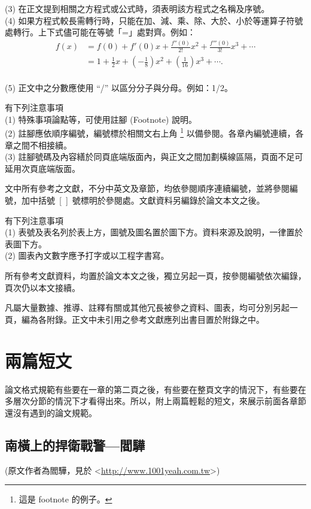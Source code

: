 \begin{description}
(3) 在正文提到相關之方程式或公式時，須表明該方程式之名稱及序號。\\
(4) 如果方程式較長需轉行時，只能在加、減、乘、除、大於、小於等運算子符號處轉行。上下式儘可能在等號「=」處對齊。例如：
\begin{equation}
\begin{split}
f(x) &= f(0) + f'(0)x + \frac{f''(0)}{2!}x^2 + \frac{f'''(0)}{3!}x^3 +\cdots \\
    &=1+\frac{1}{2}x+\left(-\frac{1}{8}\right)x^{2}+\left(\frac{1}{16}\right)x^{3}+\cdots.
\end{split}
\end{equation}\\
(5) 正文中之分數應使用 ``/'' 以區分分子與分母。例如：1/2。
\item[論文本文註腳] 有下列注意事項\\
(1) 特殊事項論點等，可使用註腳 (Footnote) 說明。\\
(2) 註腳應依順序編號，編號標於相關文右上角%
\footnote{這是 footnote 的例子。}%
以備參閱。各章內編號連續，各章之間不相接續。\\
(3) 註腳號碼及內容繕於同頁底端版面內，與正文之間加劃橫線區隔，頁面不足可延用次頁底端版面。
\item[論文本文文獻參閱] 文中所有參考之文獻，不分中英文及章節，均依參閱順序連續編號，並將參閱編號，加中括號~[~]~號標明於參閱處。文獻資料另編錄於論文本文之後。
\item[論文本文圖表編排] 有下列注意事項\\
(1) 表號及表名列於表上方，圖號及圖名置於圖下方。資料來源及說明，一律置於表圖下方。\\
(2) 圖表內文數字應予打字或以工程字書寫。
\item[參考文獻資料編排] 所有參考文獻資料，均置於論文本文之後，獨立另起一頁，按參閱編號依次編錄，頁次仍以本文接續。
\item[附錄] 凡屬大量數據、推導、註釋有關或其他冗長被參之資料、圖表，均可分別另起一頁，編為各附錄。正文中未引用之參考文獻應列出書目置於附錄之中。
\end{description}

\chapter{兩篇短文}
論文格式規範有些要在一章的第二頁之後，有些要在整頁文字的情況下，有些要在多層次分節的情況下才看得出來。所以，附上兩篇輕鬆的短文，來展示前面各章節還沒有遇到的論文規範。

\section{南橫上的捍衛戰警—閻驊}
\label{speed}
(原文作者為閻驊，見於 \textless{}\url{http://www.1001yeah.com.tw}\textgreater{})

